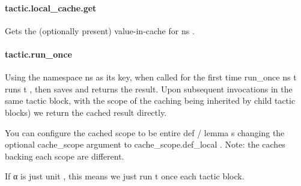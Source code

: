 \documentclass{article}
\begin{document}
\paragraph{tactic.local\_cache.get}
\par
Gets the (optionally present) value-in-cache for 
\colorbox[RGB]{253,246,227}{{{{\color[RGB]{101, 123, 131} ns }}}}.
\paragraph{tactic.run\_once}
\par
Using the namespace 
\colorbox[RGB]{253,246,227}{{{{\color[RGB]{101, 123, 131} ns }}}} as its key, when called for the first
time 
\colorbox[RGB]{253,246,227}{{{{\color[RGB]{101, 123, 131} run\_once ns t }}}} runs 
\colorbox[RGB]{253,246,227}{{{{\color[RGB]{101, 123, 131} t }}}}, then saves and returns the result.
Upon subsequent invocations in the same tactic block, with the scope
of the caching being inherited by child tactic blocks) we return the
cached result directly.
\par
You can configure the cached scope to be entire 
\colorbox[RGB]{253,246,227}{{{{\color[RGB]{133, 153, 0} def }}}}/
\colorbox[RGB]{253,246,227}{{{{\color[RGB]{133, 153, 0} lemma }}}}s changing
the optional cache\_scope argument to 
\colorbox[RGB]{253,246,227}{{{{\color[RGB]{101, 123, 131} cache\_scope.def\_local }}}}.
Note: the caches backing each scope are different.
\par
If 
\colorbox[RGB]{253,246,227}{{{{\color[RGB]{101, 123, 131} α }}}} is just 
\colorbox[RGB]{253,246,227}{{{{\color[RGB]{101, 123, 131} unit }}}}, this means we just run 
\colorbox[RGB]{253,246,227}{{{{\color[RGB]{101, 123, 131} t }}}} once each tactic
block.
\end{document}
